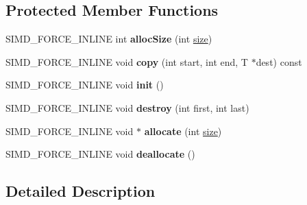 \subsection*{Protected Member Functions}
\begin{DoxyCompactItemize}
\item 
\hypertarget{classbt_aligned_object_array_aedd4d8b9a38019cb1f98f794a6bb503d}{S\+I\+M\+D\+\_\+\+F\+O\+R\+C\+E\+\_\+\+I\+N\+L\+I\+N\+E int {\bfseries alloc\+Size} (int \hyperlink{classbt_aligned_object_array_a6bdd14c7599ecb95e8d83dd5a715f9b7}{size})}\label{classbt_aligned_object_array_aedd4d8b9a38019cb1f98f794a6bb503d}

\item 
\hypertarget{classbt_aligned_object_array_a8ce92ec1a47cfd33242e8dc8ac580c99}{S\+I\+M\+D\+\_\+\+F\+O\+R\+C\+E\+\_\+\+I\+N\+L\+I\+N\+E void {\bfseries copy} (int start, int end, T $\ast$dest) const }\label{classbt_aligned_object_array_a8ce92ec1a47cfd33242e8dc8ac580c99}

\item 
\hypertarget{classbt_aligned_object_array_a336631607f9f5f08001866ed11b5fd64}{S\+I\+M\+D\+\_\+\+F\+O\+R\+C\+E\+\_\+\+I\+N\+L\+I\+N\+E void {\bfseries init} ()}\label{classbt_aligned_object_array_a336631607f9f5f08001866ed11b5fd64}

\item 
\hypertarget{classbt_aligned_object_array_a6dc404237b049258d12fb2ca62b934f7}{S\+I\+M\+D\+\_\+\+F\+O\+R\+C\+E\+\_\+\+I\+N\+L\+I\+N\+E void {\bfseries destroy} (int first, int last)}\label{classbt_aligned_object_array_a6dc404237b049258d12fb2ca62b934f7}

\item 
\hypertarget{classbt_aligned_object_array_a8943d09db3d72365b8c3ac6046225858}{S\+I\+M\+D\+\_\+\+F\+O\+R\+C\+E\+\_\+\+I\+N\+L\+I\+N\+E void $\ast$ {\bfseries allocate} (int \hyperlink{classbt_aligned_object_array_a6bdd14c7599ecb95e8d83dd5a715f9b7}{size})}\label{classbt_aligned_object_array_a8943d09db3d72365b8c3ac6046225858}

\item 
\hypertarget{classbt_aligned_object_array_acebca91940aecdb1c11718bc08b511c9}{S\+I\+M\+D\+\_\+\+F\+O\+R\+C\+E\+\_\+\+I\+N\+L\+I\+N\+E void {\bfseries deallocate} ()}\label{classbt_aligned_object_array_acebca91940aecdb1c11718bc08b511c9}

\end{DoxyCompactItemize}


\subsection{Detailed Description}
